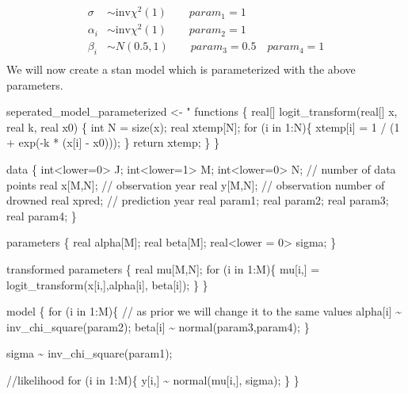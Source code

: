 \documentclass[
]{article}
\newenvironment{Shaded}{\begin{snugshade}}{\end{snugshade}}
\newcommand{\NormalTok}[1]{#1}
\newcommand{\OtherTok}[1]{\textcolor[rgb]{0.56,0.35,0.01}{#1}}
\newcommand{\StringTok}[1]{\textcolor[rgb]{0.31,0.60,0.02}{#1}}
\begin{document}
\[
\begin{aligned}
\sigma &\sim \text{inv}\chi^2(1) \qquad param_1 = 1\\
\alpha_i &\sim \text{inv}\chi^2(1) \qquad param_2 = 1\\
\beta_i &\sim N(0.5,1) \qquad param_3 = 0.5 \quad param_4 = 1\\
\end{aligned}
\] We will now create a stan model which is parameterized with the above
parameters.

\begin{Shaded}
\begin{Highlighting}[]
\NormalTok{seperated\_model\_parameterized }\OtherTok{\textless{}{-}} \StringTok{"}
\StringTok{functions \{}
\StringTok{  real[] logit\_transform(real[] x, real k, real x0) \{}
\StringTok{    int N = size(x);}
\StringTok{    real xtemp[N];}
\StringTok{    for (i in 1:N)\{}
\StringTok{      xtemp[i] = 1 / (1 + exp({-}k * (x[i] {-} x0)));}
\StringTok{    \}}
\StringTok{     return xtemp;}
\StringTok{  \}}
\StringTok{\}}

\StringTok{data \{}
\StringTok{    int\textless{}lower=0\textgreater{} J;}
\StringTok{    int\textless{}lower=1\textgreater{} M;}
\StringTok{    int\textless{}lower=0\textgreater{} N; // number of data points}
\StringTok{    real x[M,N]; // observation year}
\StringTok{    real y[M,N]; // observation number of drowned}
\StringTok{    real xpred;  // prediction year}
\StringTok{    real param1;}
\StringTok{    real param2;}
\StringTok{    real param3;}
\StringTok{    real param4;}
\StringTok{\}}

\StringTok{parameters \{}
\StringTok{  real alpha[M];}
\StringTok{  real beta[M];}
\StringTok{  real\textless{}lower = 0\textgreater{} sigma;}
\StringTok{\}}

\StringTok{transformed parameters \{}
\StringTok{  real mu[M,N];}
\StringTok{  for (i in 1:M)\{}
\StringTok{    mu[i,] = logit\_transform(x[i,],alpha[i], beta[i]);}
\StringTok{  \}}
\StringTok{\}}

\StringTok{model \{}
\StringTok{  for (i in 1:M)\{}
\StringTok{    // as prior we will change it to the same values}
\StringTok{    alpha[i] \textasciitilde{} inv\_chi\_square(param2);}
\StringTok{    beta[i] \textasciitilde{} normal(param3,param4);}
\StringTok{  \}}

\StringTok{  sigma \textasciitilde{} inv\_chi\_square(param1);}

\StringTok{  //likelihood}
\StringTok{  for (i in 1:M)\{}
\StringTok{    y[i,] \textasciitilde{} normal(mu[i,], sigma);}
\StringTok{  \}}
\StringTok{\}}


\end{Highlighting}
\end{Shaded}
\end{document}
